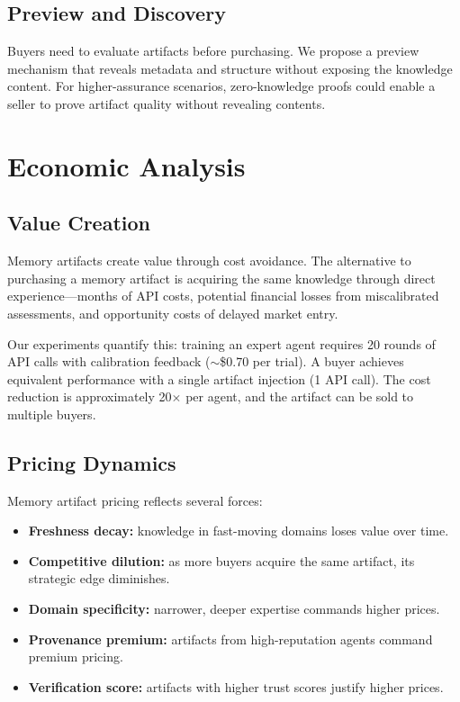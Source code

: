 \documentclass[11pt]{article}
\begin{document}
\subsection{Preview and Discovery}

Buyers need to evaluate artifacts before purchasing. We propose a preview mechanism that reveals metadata and structure without exposing the knowledge content. For higher-assurance scenarios, zero-knowledge proofs could enable a seller to prove artifact quality without revealing contents.

\section{Economic Analysis}
\label{sec:economics}

\subsection{Value Creation}

Memory artifacts create value through cost avoidance. The alternative to purchasing a memory artifact is acquiring the same knowledge through direct experience---months of API costs, potential financial losses from miscalibrated assessments, and opportunity costs of delayed market entry.

Our experiments quantify this: training an expert agent requires 20 rounds of API calls with calibration feedback ($\sim$\$0.70 per trial). A buyer achieves equivalent performance with a single artifact injection (1 API call). The cost reduction is approximately 20$\times$ per agent, and the artifact can be sold to multiple buyers.

\subsection{Pricing Dynamics}

Memory artifact pricing reflects several forces:
\begin{itemize}[leftmargin=2em]
  \item \textbf{Freshness decay:} knowledge in fast-moving domains loses value over time.
  \item \textbf{Competitive dilution:} as more buyers acquire the same artifact, its strategic edge diminishes.
  \item \textbf{Domain specificity:} narrower, deeper expertise commands higher prices.
  \item \textbf{Provenance premium:} artifacts from high-reputation agents command premium pricing.
  \item \textbf{Verification score:} artifacts with higher trust scores justify higher prices.
\end{itemize}
\end{document}
